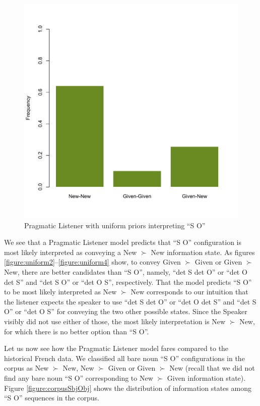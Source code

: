 \documentclass[output=paper,modfonts,nonflat]{langsci/langscibook}
\begin{document}
\begin{figure}
\includegraphics[scale = 0.45]{figures/plotPragmaticListenerSbjObjUniform}
\caption{Pragmatic Listener with uniform priors interpreting ``S O''}\label{figure:uniform5}
\end{figure}

We see that a Pragmatic Listener model predicts that ``S O'' configuration is most likely interpreted as conveying a New $\succ$ New information state. As figures \ref{figure:uniform2}--\ref{figure:uniform4} show, to convey Given $\succ$ Given or Given $\succ$ New, there are better candidates than ``S O'', namely, ``{\sc det} S {\sc det} O'' or ``{\sc det} O {\sc det} S'' and ``{\sc det} S O'' or ``{\sc det} O S'', respectively. That the model predicts ``S O'' to be most likely interpreted as New $\succ$ New corresponds to our intuition that the listener expects the speaker to use ``{\sc det} S {\sc det} O'' or ``{\sc det} O {\sc det} S'' and ``{\sc det} S O'' or ``{\sc det} O S'' for conveying the two other possible states. Since the Speaker visibly did not use either of those, the most likely interpretation is New $\succ$ New, for which there is no better option than ``S O''.

Let us now see how the Pragmatic Listener model fares compared to the historical French data. We classified all bare noun ``S O'' configurations in the corpus as New $\succ$ New, New $\succ$ Given or Given $\succ$ New (recall that we did not find any bare noun ``S O'' corresponding to New $\succ$ Given information state). Figure \ref{figure:corpusSbjObj} shows the distribution of information states among ``S O'' sequences in the corpus.
\end{document}
